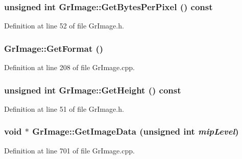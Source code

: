 \begin{CompactItemize}
{\subsubsection[{GetBytesPerPixel}]{\setlength{\rightskip}{0pt plus 5cm}unsigned int GrImage::GetBytesPerPixel () const}}
\label{class_gr_image_b1d89088b96f628d59c886e1224f5ac2}




Definition at line 52 of file GrImage.h.\hypertarget{class_gr_image_747e1e9fbe3f7faad890d217fe163d0d}{
\subsubsection[{GetFormat}]{ GrImage::GetFormat ()}}
\label{class_gr_image_747e1e9fbe3f7faad890d217fe163d0d}




Definition at line 208 of file GrImage.cpp.\hypertarget{class_gr_image_5317f4f29d4145a774921960c54935af}{
\subsubsection[{GetHeight}]{\setlength{\rightskip}{0pt plus 5cm}unsigned int GrImage::GetHeight () const}}
\label{class_gr_image_5317f4f29d4145a774921960c54935af}




Definition at line 51 of file GrImage.h.\hypertarget{class_gr_image_00e8787cde46c9cb3c994cf365570094}{
\subsubsection[{GetImageData}]{\setlength{\rightskip}{0pt plus 5cm}void $\ast$ GrImage::GetImageData (unsigned int {\em mipLevel})}}
\label{class_gr_image_00e8787cde46c9cb3c994cf365570094}




Definition at line 701 of file GrImage.cpp.\hypertarget{class_gr_image_2bdbae66e962b141e9b0509fa5d0baf5}{
}
\end{CompactItemize}
